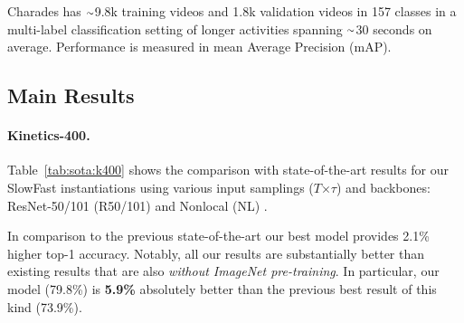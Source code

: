 \documentclass[10pt,twocolumn,letterpaper]{article}
\newcommand{\tblref}[1]{Table~\ref{#1}}
\newcommand{\app}{\raise.17ex\hbox{$\scriptstyle\sim$}}
\def\x{$\times$}
\begin{document}
	Charades \cite{Sigurdsson2016} has $\app$9.8k training videos and 1.8k validation videos in 157 classes in a multi-label classification setting of longer activities spanning $\app$30 seconds on average. Performance is measured in mean Average Precision (mAP).
	
	\subsection{Main Results}
		
\paragraph{Kinetics-400.} \tblref{tab:sota:k400} shows the comparison with state-of-the-art results for our SlowFast instantiations using various input samplings ($T$\x$\tau$) and backbones: ResNet-50/101 (R50/101) \cite{He2016} and Nonlocal (NL) \cite{Wang2018}.

	In comparison to the previous state-of-the-art \cite{Wang2018} our best  model provides 2.1\% higher top-1 accuracy. 
	Notably, all our results are substantially better than existing results that are also \emph{without ImageNet pre-training}. In particular, our model (79.8\%) is \textbf{5.9\%} absolutely better than the previous best result of this kind (73.9\%). 
	
\end{document}
